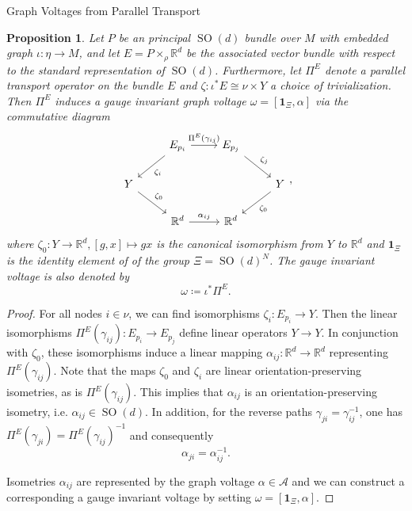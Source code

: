 \documentclass[10pt,reqno]{amsart}
\numberwithin{equation}{section}
\theoremstyle{bfnote}
\newtheorem{proposition}[theorem]{Proposition}
\theoremstyle{bfdef}
\newcommand{\mc}[1]{\mathcal{#1}}
\newcommand{\mbf}[1]{\mathbf{#1}}
\newcommand{\R}{\mathbb{R}}
\DeclareMathOperator{\SO}{SO}
\begin{document}
\begin{subsection}{Graph Voltages from Parallel Transport}
	\begin{proposition}\label{prop:gaute-to-volt}
		Let $P$ be an principal $\SO(d)$ bundle over $M$ with embedded graph $\iota : \eta \to M$, and let $E = P \times_{\rho} \R^{d}$ be the associated vector bundle with respect to the standard representation of $\SO(d)$. Furthermore, let $\Pi^E$ denote a parallel transport operator on the bundle $E$ and $\zeta: \iota^* E \cong \nu \times Y$ a choice of trivialization. Then $\Pi^E$ induces a gauge invariant graph voltage $\omega=[\mbf{1}_\Xi,\alpha]$ via the commutative diagram
		\begin{equation}
			\begin{tikzcd}
				& E_{p_i} \ar[dl,"\zeta_i"]\ar[r,"\Pi^E(\gamma_{ij})"] & E_{p_j} \ar[dr,"\zeta_j"] & \\
				Y \ar[dr,"\zeta_{0}"] & & & Y \ar[dl,"\zeta_{0}"] \\
			  &	\R^d \ar[r,"\alpha_{ij}"] & \R^d &
			\end{tikzcd}, 
		\end{equation}
		where $\zeta_0 : Y \to \R^d, [g,x] \mapsto gx$ is the canonical isomorphism from $Y$ to $\R^d$ and $\mbf{1}_\Xi$ is the identity element of of the group $\Xi = \SO(d)^N$. 
		The gauge invariant voltage is also denoted by 
		\begin{equation}\label{eq:omega-via-E}
			\omega \coloneq \iota^{*}\Pi^{E}.
		\end{equation}
	\end{proposition}

	\begin{proof}
		For all nodes $i \in \nu$, we can find isomorphisms $\zeta_i : E_{p_i} \to Y$. Then the linear isomorphisms $\Pi^E(\gamma_{ij}) : E_{p_i} \to E_{p_j}$ define linear operators $Y \to Y$.
		In conjunction with $\zeta_0$, these isomorphisms induce a linear mapping $\alpha_{ij} : \R^d \to \R^d$ representing $\Pi^E(\gamma_{ij})$. 
		Note that the maps $\zeta_{0}$ and $\zeta_i$ are linear orientation-preserving isometries, as is $\Pi^{E}(\gamma_{ij})$. This implies that $\alpha_{ij}$ is an orientation-preserving isometry, i.e. $\alpha_{ij} \in \SO(d)$.
		In addition, for the reverse paths $\gamma_{ji} = \gamma_{ij}^{-1}$, one has $\Pi^E(\gamma_{ji}) = \Pi^E(\gamma_{ij})^{-1}$ and consequently
		\begin{equation}
			\alpha_{ji} = \alpha_{ij}^{-1}.
		\end{equation}

		Isometries $\alpha_{ij}$ are represented by the graph voltage $\alpha \in \mc{A}$ and we can construct a corresponding a gauge invariant voltage by setting $\omega = [\mbf{1}_\Xi,\alpha]$.
	\end{proof}


\end{subsection}
\end{document}

